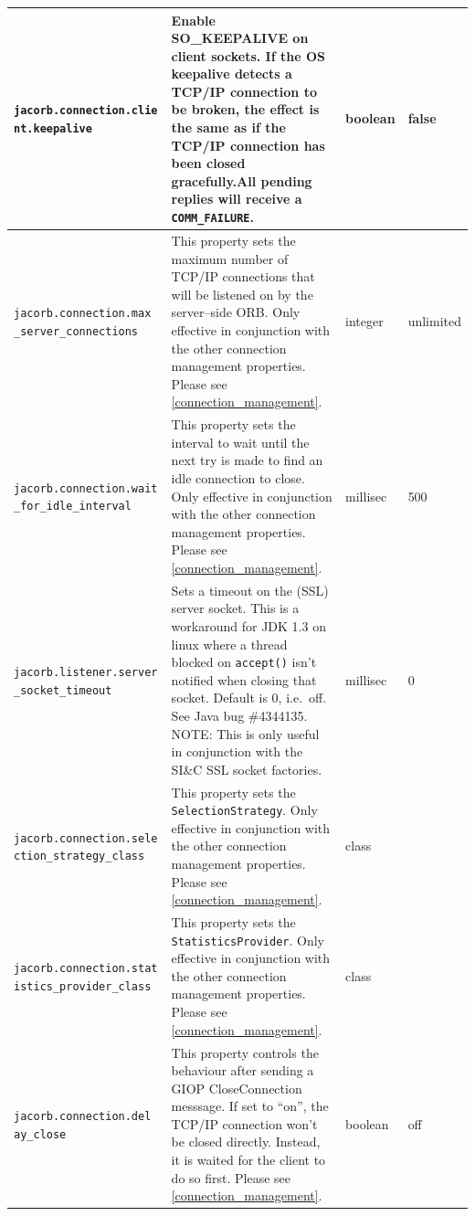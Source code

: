 \begin{small}
\begin{longtable}{|p{5cm}|p{7.5cm}|p{1.5cm}|p{1.5cm}|}
\hline
\verb"jacorb.connection.clie"
\verb"nt.keepalive" & Enable SO\_KEEPALIVE on client sockets. If the OS
keepalive detects a TCP/IP connection to be broken, the effect is the same as
if the TCP/IP connection has been closed gracefully.All pending replies will
receive a {\tt COMM\_FAILURE}. & boolean & false \\
\hline
\verb"jacorb.connection.max"
\verb"_server_connections" & This property sets the
  maximum number of TCP/IP connections that will be listened on by the
  server--side ORB. Only effective in conjunction with the other connection
  management properties. Please see \ref{connection_management}.& integer &
  unlimited \\

\hline
\verb"jacorb.connection.wait"
\verb"_for_idle_interval" & This property sets the
  interval to wait until the next try is made to find an idle connection to
  close. Only effective in conjunction with the other connection management
  properties. Please see \ref{connection_management}. & millisec & 500\\

\hline
\verb"jacorb.listener.server"
\verb"_socket_timeout" & Sets a timeout on the (SSL) server socket. This is a
workaround for JDK 1.3 on linux where a thread blocked on \verb"accept()"
isn't notified when closing that socket. Default is 0, i.e.~off. See Java bug
\#4344135. NOTE: This is only useful in conjunction with the SI\&C SSL socket
factories. & millisec & 0\\
\hline
\verb"jacorb.connection.sele"
\verb"ction_strategy_class" & This property sets
  the {\tt Selection\-Strategy}. Only effective in conjunction with the other
  connection management  properties. Please see \ref{connection_management}. &
  class & \\
\hline
\verb"jacorb.connection.stat"
\verb"istics_provider_class" & This property sets
  the {\tt Statistics\-Provider}. Only effective in conjunction with the other
  connection management properties. Please see \ref{connection_management}. &
  class & \\

\hline
\verb"jacorb.connection.del"
\verb"ay_close" & This property controls the behaviour after sending a GIOP
CloseConnection messsage. If set to ``on'', the TCP/IP connection won't be
closed directly. Instead, it is waited for the client to do so
first. Please see \ref{connection_management}. & boolean & off \\
\hline


\end{longtable}
\end{small}
